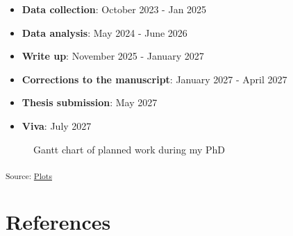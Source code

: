 \documentclass[
  letterpaper,
  DIV=11,
  numbers=noendperiod]{scrartcl}
\providecommand{\tightlist}{%
  \setlength{\itemsep}{0pt}\setlength{\parskip}{0pt}}\usepackage{longtable,booktabs,array}
\begin{document}
\begin{itemize}
\tightlist
\item
  \textbf{Data collection}: October 2023 - Jan 2025
\item
  \textbf{Data analysis}: May 2024 - June 2026
\item
  \textbf{Write up}: November 2025 - January 2027
\item
  \textbf{Corrections to the manuscript}: January 2027 - April 2027
\item
  \textbf{Thesis submission}: May 2027
\item
  \textbf{Viva}: July 2027
\end{itemize}

\begin{figure}[H]


\caption{\label{fig-gantt-chart}Gantt chart of planned work during my
PhD}

\end{figure}%

\textsubscript{Source:
\href{https://juliam98.github.io/phd-upgrade-proposal/notebooks/plots-preview.html\#cell-fig-gantt-chart}{Plots}}

\newpage{}

\section{References}\label{references}

\printbibliography[heading=none]
\end{document}
